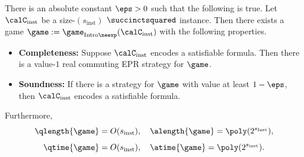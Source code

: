 \begin{corollary}\label{cor:succinct-sat-protocol-with-big-answer-size}
There is an absolute constant $\eps > 0$ such that the following is true.
Let $\calC_{\mathrm{inst}}$ be a size-$(s_{\mathrm{inst}})$ $\succinctsquared$ instance.
Then there exists a game $\game := \game_{\mathrm{Intro}\neexp}(\calC_{\mathrm{inst}})$ with the following properties.
\begin{itemize}
\item[$\circ$] \textbf{Completeness:}
		Suppose $\calC_{\mathrm{inst}}$ encodes a satisfiable formula.
		Then there is a value-$1$ real commuting EPR strategy for $\game$.
\item[$\circ$] \textbf{Soundness:}
		If there is a strategy for $\game$ with value at least $1-\eps$,
		then $\calC_{\mathrm{inst}}$ encodes a satisfiable formula.
\end{itemize}
Furthermore,
\begin{equation*}
\qlength{\game} = O(s_{\mathrm{inst}}), \quad
\alength{\game} = \poly(2^{s_{\mathrm{Inst}}}),
\end{equation*}
\begin{equation*}
\qtime{\game} = O(s_{\mathrm{inst}}), \quad
\atime{\game} = \poly(2^{s_{\mathrm{inst}}}).
\end{equation*}
\end{corollary}
